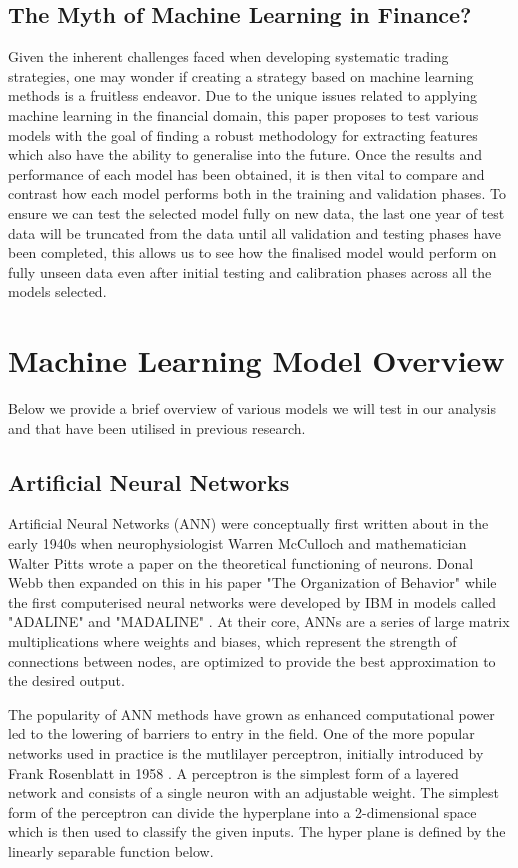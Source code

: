 \documentclass[11pt]{article}
\begin{document}
\subsection{The Myth of Machine Learning in Finance?}
Given the inherent challenges faced when developing systematic trading strategies, one may wonder if creating a strategy based on machine learning methods is a fruitless endeavor.
\newline Due to the unique issues related to applying machine learning in the financial domain, this paper proposes to test various models with the goal of finding a robust methodology for extracting features which also have the ability to generalise into the future. Once the results and performance of each model has been obtained, it is then vital to compare and contrast how each model performs both in the training and validation phases. \newline To ensure we can test the selected model fully  on new data, the last one year of test data will be truncated from the data until all validation and testing phases have been completed, this allows us to see how the finalised model would perform on fully unseen data even after initial testing and calibration phases across all the models selected.

\section{Machine Learning Model Overview}
 Below we provide a brief overview of various models we will test in our analysis and that have been utilised in previous research.

\subsection{Artificial Neural Networks}
Artificial Neural Networks (ANN) were conceptually first written about in the early 1940s \cite{Widrow1990} when neurophysiologist Warren McCulloch and mathematician Walter Pitts wrote a paper on the theoretical functioning of neurons. Donal Webb then expanded on this in his paper "The Organization of Behavior" while the first computerised neural networks were developed by IBM in models called "ADALINE" and "MADALINE" \cite{Widrow1990}. At their core, ANNs are a series of large matrix multiplications where weights and biases, which represent the strength of connections between nodes, are optimized to provide the best approximation to the desired output.\par The popularity of ANN methods have grown as enhanced computational power led to the lowering of barriers to entry in the field. One of the more popular networks used in practice is the mutlilayer perceptron, initially introduced by Frank Rosenblatt in 1958 \cite{Rosenblatt1958}. A perceptron is the simplest form of a layered network and consists of a single neuron with an adjustable weight. The simplest form of the perceptron can divide the hyperplane into a 2-dimensional space which is then used to classify the given inputs. The hyper plane is defined by the linearly separable function below.
\end{document}

